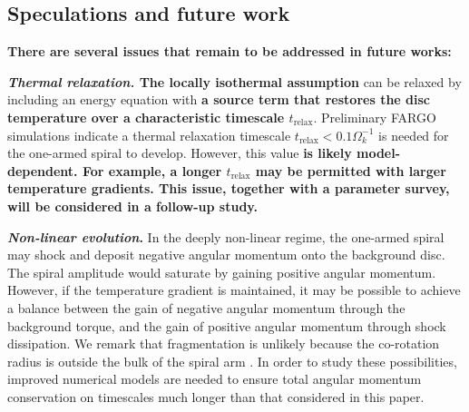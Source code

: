 \subsection{Speculations and future work}

{\bf There are several issues that remain to be addressed in future
  works:} 

{\bf \emph{Thermal relaxation.} The locally isothermal assumption 
} can be relaxed by including an energy equation with
{\bf a source term that restores the disc temperature over a
  characteristic timescale $t_\mathrm{relax}$}. Preliminary FARGO
simulations indicate a thermal relaxation timescale $t_\mathrm{relax} <
0.1\Omega_k^{-1}$ is needed for the one-armed spiral to
develop. However, this value {\bf is likely model-dependent. For example,
a longer $t_\mathrm{relax}$ may be permitted with larger temperature
gradients. This issue, together with a parameter survey, will be
considered in a follow-up study.} 


{\bf \emph{Non-linear evolution}.} In the deeply non-linear regime, the
one-armed spiral may  
shock and deposit negative angular momentum onto 
the background disc. The spiral amplitude would saturate by gaining
positive angular momentum. However, if the temperature gradient is
maintained, it may be possible to achieve a balance between the gain
of negative angular momentum through the background torque, and the
gain of positive angular momentum through shock dissipation. We remark  
that fragmentation is unlikely because the co-rotation radius is
outside the bulk of the spiral arm \citep{durisen08,rogers12}. In order
to study these possibilities, improved numerical models are needed to
ensure total angular momentum conservation on timescales much longer
than that considered in this paper. 



